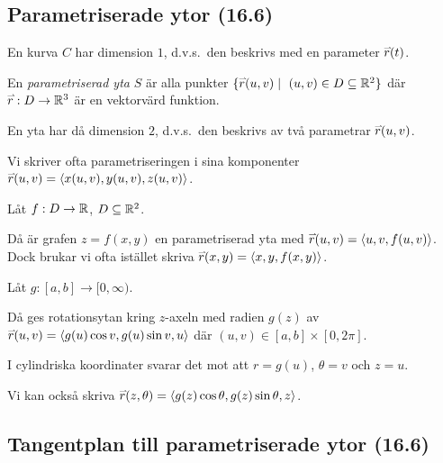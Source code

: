 \documentclass[a4paper]{article}
\begin{document}
\providecommand\fname{}
\renewcommand\fname{19-10-10}

\subsection{Parametriserade ytor (16.6)}
En kurva \(
    C
\) har dimension \(
    1
\), d.v.s.\ den beskrivs med en parameter \(
    \accentset{\rightharpoonup}{r}(t) 
\). 

\begin{defn}
    En \emph{parametriserad yta} \(
        S
    \) är alla punkter \(
        \{ \ver(u,v) \; | \; (u,v) \in D \subseteq \realn^2 \}
    \) där \(
        \accentset{\rightharpoonup}{r} : D \to \mathbb{R}^3
    \) är en vektorvärd funktion. 
\end{defn}

En yta har då dimension \(
    2
\), d.v.s.\ den beskrivs av två parametrar \(
    \accentset{\rightharpoonup}{r}(u,v)
\). 

Vi skriver ofta parametriseringen i sina komponenter \(
    \accentset{\rightharpoonup}{r}(u,v) = \left\langle x(u,v), y(u,v), z(u,v) \right\rangle
\). 

\begin{ex}
    Låt \(
        f : D \to \mathbb{R}
    \), \(
        D \subseteq \mathbb{R}^2
    \). 

    Då är grafen \(
        z = f(x,y)
    \) en parametriserad yta med \(
        \accentset{\rightharpoonup}{r}(u,v) = \left\langle u, v, f(u,v) \right\rangle
    \). Dock brukar vi ofta istället skriva \(
        \accentset{\rightharpoonup}{r}(x,y) = \left\langle x, y, f(x,y) \right\rangle
    \).
\end{ex}

\begin{ex}
    Låt \(
        g : [a,b] \to [0, \infty)
    \). 

    Då ges rotationsytan kring \(
        z
    \)-axeln med radien \(
        g(z)
    \) av \(
        \accentset{\rightharpoonup}{r}(u,v) = \left\langle g(u) \cos v, g(u) \sin v, u\right\rangle
    \) där \(
        (u,v) \in [a,b] \times [0, 2\pi]
    \).

    I cylindriska koordinater svarar det mot att \(
        r = g(u) 
    \), \(
        \theta = v
    \) och \(
        z = u
    \).

    Vi kan också skriva \(
        \accentset{\rightharpoonup}{r}(z, \theta) = \left\langle g(z) \cos \theta, g(z) \sin \theta, z\right\rangle
    \).
\end{ex}

\subsection{Tangentplan till parametriserade ytor (16.6)}
\end{document}
